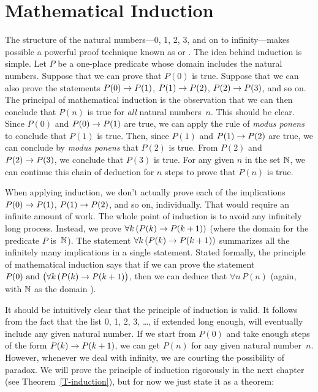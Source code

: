 \section{Mathematical Induction}


The structure of the natural numbers---0, 1, 2, 3, and on to infinity---makes 
possible a powerful proof technique known as  or .
The idea behind induction is simple.  Let $P$ be a one-place predicate
whose domain includes the natural numbers.  Suppose that
we can prove that $P(0)$ is true.  Suppose that we can also prove
the statements $P(0)\rightarrow P(1)$, $P(1)\rightarrow P(2)$, $P(2)\rightarrow P(3)$,
and so on.  The principal of mathematical induction is the observation
that we can then conclude that $P(n)$ is true for \textit{all} natural
numbers~$n$.
This should be clear.  Since $P(0)$ and $P(0)\rightarrow P(1)$ are true,
we can apply the rule of \textit{modus ponens} to conclude that $P(1)$
is true.  Then, since $P(1)$ and $P(1)\rightarrow P(2)$ are true, we can
conclude by \textit{modus ponens} that $P(2)$ is true.  From $P(2)$
and $P(2)\rightarrow P(3)$, we conclude that $P(3)$ is true.  For any
given $n$ in the set ${\mathbb N}$, we can continue this chain of deduction for $n$ steps
to prove that $P(n)$ is true.

When applying induction, we don't actually prove each of the
implications $P(0)\rightarrow P(1)$, $P(1)\rightarrow P(2)$, and so on, individually.
That would require an infinite amount of work.  The whole point of
induction is to avoid any infinitely long process.  Instead, we
prove $\forall k\,(P(k)\rightarrow P(k+1))$ (where the domain for the
predicate $P$ is~${\mathbb N}$).
The statement $\forall k\,(P(k)\rightarrow P(k+1))$ summarizes all the
infinitely many implications in a single statement.  Stated formally,
the principle of
mathematical induction says that if we can prove the statement
$P(0)\text{ and } \big(\forall k\,(P(k)\rightarrow P(k+1)\big)$, then we 
can deduce that $\forall n\,P(n)$ (again, with ${\mathbb N}$ as the domain
).

It should be intuitively clear that the principle of induction
is valid.  It follows from the fact that the list 0, 1, 2, 3, \dots,
if extended long enough, will eventually include any given
natural number.  If we start from $P(0)$ and take enough steps
of the form $P(k)\rightarrow P(k+1)$, we can get $P(n)$ for any given natural number~$n$.
However, whenever we deal with infinity, we are courting the possibility
of paradox.  We will prove the principle of induction rigorously
in the next chapter (see Theorem~\ref{T-induction}), but for now
we just state it as a theorem:

